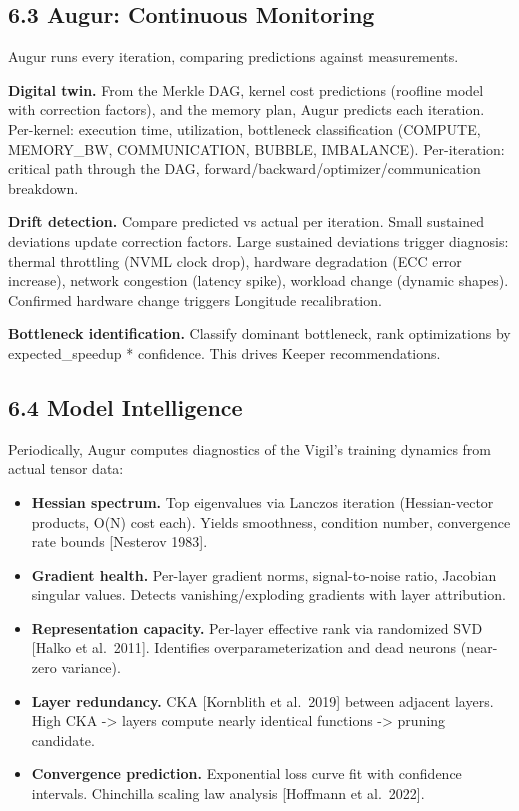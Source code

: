 \subsection{6.3 Augur: Continuous Monitoring}\label{augur-continuous-monitoring}

Augur runs every iteration, comparing predictions against measurements.

\textbf{Digital twin.} From the Merkle DAG, kernel cost predictions (roofline model with correction factors), and the memory plan, Augur predicts each iteration. Per-kernel: execution time, utilization, bottleneck classification (COMPUTE, MEMORY\_BW, COMMUNICATION, BUBBLE, IMBALANCE). Per-iteration: critical path through the DAG, forward/backward/optimizer/communication breakdown.

\textbf{Drift detection.} Compare predicted vs actual per iteration. Small sustained deviations update correction factors. Large sustained deviations trigger diagnosis: thermal throttling (NVML clock drop), hardware degradation (ECC error increase), network congestion (latency spike), workload change (dynamic shapes). Confirmed hardware change triggers Longitude recalibration.

\textbf{Bottleneck identification.} Classify dominant bottleneck, rank optimizations by expected\_speedup * confidence. This drives Keeper recommendations.

\subsection{6.4 Model Intelligence}\label{model-intelligence}

Periodically, Augur computes diagnostics of the Vigil's training dynamics from actual tensor data:

\begin{itemize}
\tightlist
\item
  \textbf{Hessian spectrum.} Top eigenvalues via Lanczos iteration (Hessian-vector products, O(N) cost each). Yields smoothness, condition number, convergence rate bounds {[}Nesterov 1983{]}.
\item
  \textbf{Gradient health.} Per-layer gradient norms, signal-to-noise ratio, Jacobian singular values. Detects vanishing/exploding gradients with layer attribution.
\item
  \textbf{Representation capacity.} Per-layer effective rank via randomized SVD {[}Halko et al.~2011{]}. Identifies overparameterization and dead neurons (near-zero variance).
\item
  \textbf{Layer redundancy.} CKA {[}Kornblith et al.~2019{]} between adjacent layers. High CKA -\textgreater{} layers compute nearly identical functions -\textgreater{} pruning candidate.
\item
  \textbf{Convergence prediction.} Exponential loss curve fit with confidence intervals. Chinchilla scaling law analysis {[}Hoffmann et al.~2022{]}.
\end{itemize}

